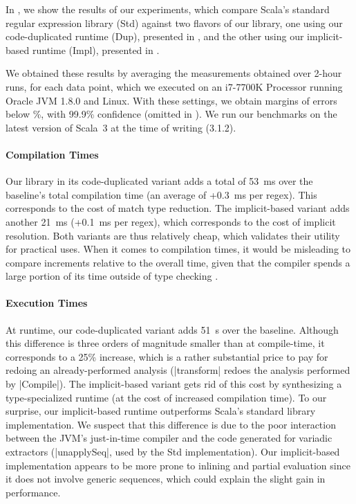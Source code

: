In , we show the results of our experiments, which compare Scala's standard regular expression library (Std) against two flavors of our library, one using our code-dupli\-cated runtime (Dup), presented in , and the other using our implicit-based runtime (Impl), presented in .


We obtained these results by averaging the measurements obtained over 2-hour runs, for each data point, which we executed on an i7-7700K Processor running Oracle JVM 1.8.0 and Linux.
With these settings, we obtain margins of errors below \%, with 99.9\% confidence (omitted in ).
We run our benchmarks on the latest version of Scala~3 at the time of writing (3.1.2).

\paragraph{Compilation Times} Our library in its code-duplicated variant adds a total of 53~ms over the baseline's total compilation time (an average of +0.3~ms per regex).
This corresponds to the cost of match type reduction.
The implicit-based variant adds another 21~ms (+0.1~ms per regex), which corresponds to the cost of implicit resolution.
Both variants are thus relatively cheap, which validates their utility for practical uses.
When it comes to compilation times, it would be misleading to compare increments relative to the overall time, given that the compiler spends a large portion of its time outside of type checking \citep[§ 2.11.3]{petrashko2017design}.

\paragraph{Execution Times} At runtime, our code-duplicated variant adds 51~\textmu s over the baseline.
Although this difference is three orders of magnitude smaller than at compile-time, it corresponds to a 25\% increase, which is a rather substantial price to pay for redoing an already-performed analysis (|transform| redoes the analysis performed by |Compile|).
The implicit-based variant gets rid of this cost by synthesizing a type-specialized runtime (at the cost of increased compilation time).
To our surprise, our implicit-based runtime outperforms Scala's standard library implementation.
We suspect that this difference is due to the poor interaction between the JVM's just-in-time compiler and the code generated for variadic extractors (|unapplySeq|, used by the Std implementation).
Our implicit-based implementation appears to be more prone to inlining and partial evaluation since it does not involve generic sequences, which could explain the slight gain in performance.

